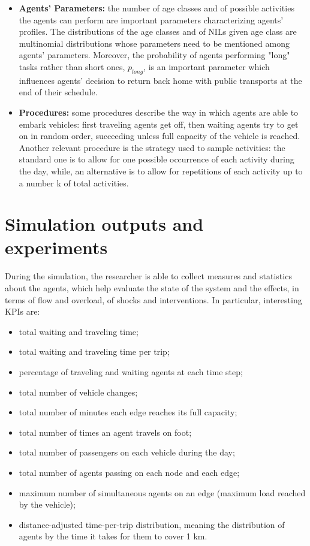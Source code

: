 \begin{itemize}
\item \textbf{Agents' Parameters:} the number of age classes and of possible activities the agents can perform are important parameters characterizing agents' profiles. The distributions of the age classes and of NILs given age class are multinomial distributions whose parameters need to be mentioned among agents' parameters. Moreover, the probability of agents performing "long" tasks rather than short ones, $p_{long}$, is an important parameter which influences agents' decision to return back home with public transports at the end of their schedule.
\item \textbf{Procedures:} some procedures describe the way in which agents are able to embark vehicles: first traveling agents get off, then waiting agents try to get on in random order, succeeding unless full capacity of the vehicle is reached. Another relevant procedure is the strategy used to sample activities: the standard one is to allow for one possible occurrence of each activity during the day, while, an alternative is to allow for repetitions of each activity up to a number k of total activities. 
\end{itemize}


\section{Simulation outputs and experiments}\label{sec:3.5}
During the simulation, the researcher is able to collect measures and statistics about the agents, which help evaluate the state of the system and the effects, in terms of flow and overload, of shocks and interventions. 
In particular, interesting KPIs are:
\begin{itemize}
    \item total waiting and traveling time;
    \item total waiting and traveling time per trip;
    \item percentage of traveling and waiting agents at each time step;
    \item total number of vehicle changes;
    \item total number of minutes each edge reaches its full capacity;
    \item total number of times an agent travels on foot;
    \item total number of passengers on each vehicle during the day;
    \item total number of agents passing on each node and each edge;
    \item maximum number of simultaneous agents on an edge (maximum load reached by the vehicle);
    \item distance-adjusted time-per-trip distribution, meaning the distribution of agents by the time it takes for them to cover 1 km.
\end{itemize}


